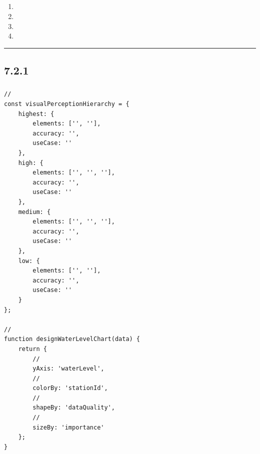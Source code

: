 \hypertarget{section-103}{%
\subsection{}\label{section-103}}

\begin{enumerate}
\def\labelenumi{\arabic{enumi}.}
\item
  \important{}
\item
  \important{}
\item
  \important{}
\item
  \important{}
\end{enumerate}

\begin{center}\rule{0.5\linewidth}{0.5pt}\end{center}

\hypertarget{section-104}{%
\subsection{}\label{section-104}}

\hypertarget{section-105}{%
\subsection{7.2.1}\label{section-105}}

\hypertarget{section-106}{%
\subsubsection{}\label{section-106}}

\hypertarget{section-107}{%
\paragraph{}\label{section-107}}

\begin{lstlisting}[style=javascript]
// 
const visualPerceptionHierarchy = {
    highest: {
        elements: ['', ''],
        accuracy: '',
        useCase: ''
    },
    high: {
        elements: ['', '', ''],
        accuracy: '',
        useCase: ''
    },
    medium: {
        elements: ['', '', ''],
        accuracy: '',
        useCase: ''
    },
    low: {
        elements: ['', ''],
        accuracy: '',
        useCase: ''
    }
};

// 
function designWaterLevelChart(data) {
    return {
        // 
        yAxis: 'waterLevel',
        // 
        colorBy: 'stationId',
        // 
        shapeBy: 'dataQuality',
        // 
        sizeBy: 'importance'
    };
}
\end{lstlisting}


